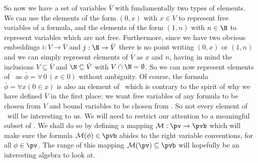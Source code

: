 So now we have a set of variables $\bar{V}$ with fundamentally two
types of elements. We can use the elements of the form $(0,x)$ with
$x\in V$ to represent free variables of a formula, and the elements
of the form $(1,n)$ with $n\in\N$ to represent variables which are
not free. Furthermore, since we have two obvious embeddings
$i:V\to\bar{V}$ and $j:\N\to\bar{V}$ there is no point writing
$(0,x)$ or $(1,n)$ and we can simply represent elements of $\bar{V}$
as $x$ and $n$, having in mind the inclusions $V\subseteq\bar{V}$
and $\N\subseteq\bar{V}$ with $V\cap\N=\emptyset$. So we can now
represent elements of \pvb\ as $\bar{\phi}=\forall\,0\,(x\in 0)$
without ambiguity. Of course, the formula $\bar{\phi}=\forall x(0\in
x)$ is also an element of \pvb\ which is contrary to the spirit of
why we have defined $\bar{V}$ in the first place: we want free
variables of any formula to be chosen from $V$ and bound variables
to be chosen from \N. So not every element of \pvb\ will be
interesting to us. We will need to restrict our attention to a
meaningful subset of \pvb. We shall do so by defining a mapping
${\cal M}:\pv\to\pvb$ which will make sure the formula ${\cal
M}(\phi)\in\pvb$ abides to the right variable conventions, for all
$\phi\in\pv$. The range of this mapping ${\cal M}(\pv)\subseteq\pvb$
will hopefully be an interesting algebra to look at.

